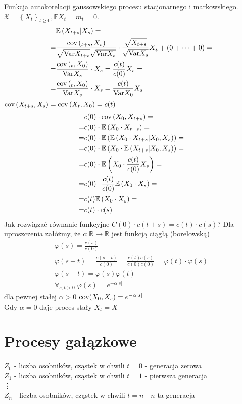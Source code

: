 \begin{prz}
Funkcja autokorelacji gaussowskiego procesu stacjonarnego i markowskiego. $ \mathfrak X=\left\{X_t\right\} _{t\ge 0}, \mathbb E X_t=m_t=0$.
\begin{align*}
&\mathbb E \left(X_{t+s}|X_s\right)
=\\=&
\frac{\text{cov}\left(_{t+s},X_s\right)}{\sqrt{\text{Var} X_{t+s}}\sqrt{\text{Var} X_s}}\cdot\frac{\sqrt{X_{t+s}}}{\sqrt{ \text{Var} X_s}}X_s+\left(0+\dots+0\right)
=\\=&
\frac{\text{cov}\left(_{t},X_0\right)}{\text{Var} X_s}\cdot X_s=\frac{c(t)}{c(0)}X_s
=\\=&
\frac{\text{cov}\left(_{t},X_0\right)}{\text{Var} X_s}\cdot X_s=\frac{c(t)}{\text{Var} X_0}X_s
\end{align*}
$ \text{cov}\left(X_{t+s},X_s\right)=\text{cov}\left(X_t,X_0\right) =c(t)$
\begin{align*}
&
c(0)\cdot \text{cov} \left(X_0,X_{t+s}\right)
=\\=&
c(0)\cdot \mathbb E \left(X_0\cdot X_{t+s}\right)
=\\=&
c(0)\cdot \mathbb E \left(\mathbb E \left(X_0\cdot X_{t+s}|X_0,X_s\right)\right)
=\\=&
c(0)\cdot \mathbb E \left(X_0\cdot\mathbb E \left( X_{t+s}|X_0,X_s\right)\right)
=\\=&
c(0)\cdot \mathbb E \left(X_0\cdot\frac{c(t)}{c(0)}X_s\right)
=\\=&
c(0)\cdot \frac{c(t)}{c(0)}\mathbb E \left(X_0\cdot X_s\right)
=\\=&
c(t)\mathbb E \left(X_0\cdot X_s\right)
=\\=&
c(t)\cdot c(s)
\end{align*}
Jak rozwiązać równanie funkcyjne $ C(0)\cdot c(t+s)=c(t)\cdot c(s) $? Dla uproszczenia załóżmy, że $ c:\mathbb R \to \mathbb R  $ jest funkcją ciągłą (borelowską)
\begin{gather*}
\varphi(s)=\frac{c(s)}{c(0)}\\
\varphi(s+t)=\frac{c(s+t)}{c(0)}=\frac{c(t)c(s)}{c(0)c(0)}=\varphi(t)\cdot \varphi(s)\\
\varphi(s+t)=\varphi(s)\varphi(t)\\
\forall_{s,t>0}\;\varphi(s)=e^{-\alpha|s|}
\end{gather*}
dla pewnej stałej $ \alpha>0 $ $ \text{cov}(X_0,X_s)=e^{-\alpha|s|} $\\
Gdy $ \alpha=0 $ daje proces stały $ X_t=X $ 
\end{prz}
\section{Procesy gałązkowe}
$ Z_0 $ - liczba osobników, cząstek w chwili $ t=0 $ - generacja zerowa\\
$ Z_1 $ - liczba osobników, cząstek w chwili $ t=1 $ - pierwsza generacja\\
\vdots\\
$ Z_n $ - liczba osobników, cząstek w chwili $ t=n $ - $ n $-ta generacja

